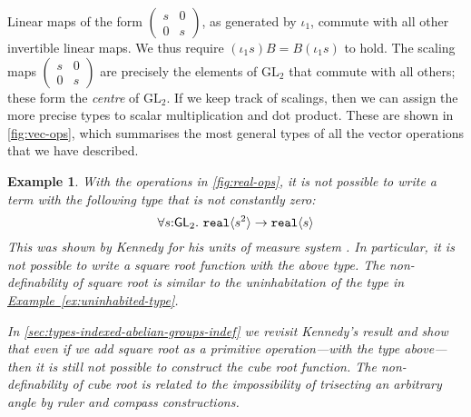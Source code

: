 \documentclass{sigplanconf}
\newcommand{\GL}[1]{\mathrm{GL}_#1}
\newcommand{\SynGL}[1]{\mathsf{GL}_#1}
\newcommand{\tyPrim}[2]{\textup{\texttt{#1}}\langle #2 \rangle}
\newcommand{\exref}[1]{\hyperref[#1]{Example~\ref*{#1}}}
\theoremstyle{examplestyle}
\newtheorem{example}{Example}
\theoremstyle{restatementstyle}
\begin{document}
Linear maps of the form $\left(
  \begin{smallmatrix}s & 0 \\ 0 & s\end{smallmatrix}\right)$, as
generated by $\iota_1$, commute with all other invertible linear
maps. We thus require
$(\iota_1 s)B = B(\iota_1 s)$ to hold.
The scaling maps $\left(
  \begin{smallmatrix}s & 0 \\ 0 & s\end{smallmatrix}\right)$
are precisely the elements of $\GL{2}$ that commute with all others;
these form the \emph{centre} of $\GL{2}$. If we keep track of
scalings, then we can assign the more precise types to
scalar multiplication and dot product. These
 are shown in \autoref{fig:vec-ops}, which summarises the most general types 
of all the vector operations that we have described.

\begin{example}
  With the operations in \autoref{fig:real-ops}, it is not possible to
  write a term with the following type that is not constantly zero:
  \begin{displaymath}
    \forall s \mathord: \SynGL{2}.\ \tyPrim{real}{s^2} \to \tyPrim{real}{s}
  \end{displaymath}
  This was shown by Kennedy for his units of measure system
  \cite{kennedy97relational}.  In particular, it is not possible to
  write a square root function with the above type.  The
  non-definability of square root is similar to the uninhabitation of the
  type in \exref{ex:uninhabited-type}.

  In \autoref{sec:types-indexed-abelian-groups-indef} we revisit
  Kennedy's result and show that even if we add square root as a
  primitive operation---with the type above---then it is still not
  possible to construct the cube root function. The non-definability of
  cube root is related to the impossibility of trisecting an arbitrary
  angle by ruler and compass constructions.
\end{example}
\end{document}
